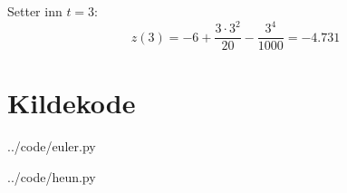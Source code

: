 Setter inn $t=3$:
\begin{equation}
  z(3) = -6 + \frac{3\cdot 3^2}{20} - \frac{3^4}{1000} = -4.731
\end{equation}





\clearpage
\section{Kildekode} %
\label{sec:kildekode}


  {../code/euler.py}


  {../code/heun.py}













